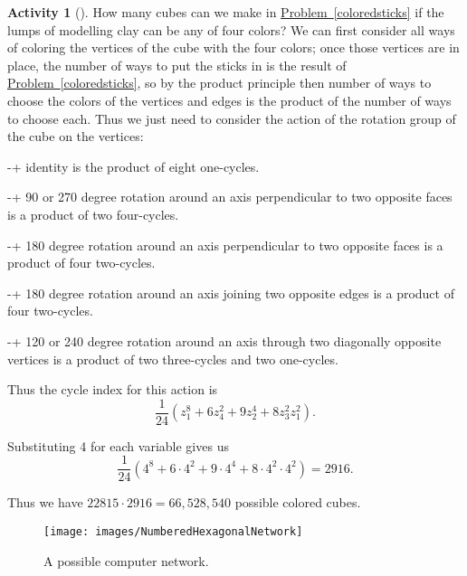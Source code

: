 \documentclass[10pt,]{book}
\theoremstyle{plain}
\theoremstyle{definition}
\newtheorem{activity}[project]{Activity}
\numberwithin{equation}{chapter}
\begin{document}
\begin{activity}[]\label{activity-317}
How many cubes can we make in \hyperref[coloredsticks]{Problem~\ref{coloredsticks}} if the lumps of modelling clay can be any of four colors?%
We can first consider all ways of coloring the vertices of the cube with the four colors; once those vertices are in place, the number of ways to put the sticks in is the result of \hyperref[coloredsticks]{Problem~\ref{coloredsticks}}, so by the product principle then number of ways to choose the colors of the vertices and edges is the product of the number of ways to choose each. Thus we just need to consider the action of the rotation group of the cube on the vertices:%
\par
-+ identity is the product of eight one-cycles.%
\par
-+ 90 or 270 degree rotation around an axis perpendicular to two opposite faces is a product of two four-cycles.%
\par
-+ 180 degree rotation around an axis perpendicular to two opposite faces is a product of four two-cycles.%
\par
-+ 180 degree rotation around an axis joining two opposite edges is a product of four two-cycles.%
\par
-+ 120 or 240 degree rotation around an axis through two diagonally opposite vertices is a product of two three-cycles and two one-cycles.%
\par
Thus the cycle index for this action is%
\begin{equation*}
\frac{1}{24}\left(z_1^8+6z_4^2 + 9z_2^4 + 8z_3^2z_1^2\right).
\end{equation*}
%
\par
Substituting 4 for each variable gives us%
\begin{equation*}
\frac{1}{24}\left(4^8+6\cdot4^2 +9\cdot 4^4 + 8\cdot4^2\cdot4^2\right)=2916.
\end{equation*}
%
\par
Thus we have \(22815\cdot2916=66,528,540\) possible colored cubes.%
\begin{figure}
\centering
\texttt{[image: images/NumberedHexagonalNetwork]}
\caption{A possible computer network.\label{HexNet}}
\end{figure}
\end{activity}
\end{document}
